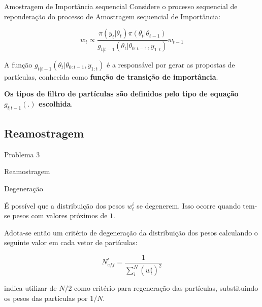 \documentclass{beamer}
\begin{document}
\begin{frame}{Amostragem de Importância sequencial}
Considere o processo sequencial de reponderação do processo de Amostragem sequencial de Importância:

$$
w_t \propto \frac{\pi(y_t|\theta_t)\pi(\theta_t|\theta_{t-1})}{g_{t|t-1}(\theta_t|\theta_{0:t-1},y_{1:t})} w_{t-1}
$$

\pause

A função $g_{t|t-1}(\theta_t|\theta_{0:t-1},y_{1:t})$ é a responsável por gerar as propostas de partículas, conhecida como \textbf{função de transição de importância}.

\vspace{0.5cm} 

\pause

\textbf{Os tipos de filtro de partículas são definidos pelo tipo de equação $g_{t|t-1}(.)$ escolhida}.

\end{frame}



\subsection{Reamostragem}

\begin{frame}{Problema 3}
    \begin{block}{}
      \Huge  Reamostragem
    \end{block}
\end{frame}


\begin{frame}{Degeneração}

É possível que a distribuição dos pesos $w^i_t$ se degenerem. Isso ocorre quando tem-se pesos com valores próximos de $1$.

\vspace{0.5cm} 
\pause

Adota-se então um critério de degeneração da distribuição dos pesos calculando o seguinte valor em cada vetor de partículas:

$$
N^t_{eff} = \frac{1}{\sum^N_ i{(w_t^{i})^2}}
$$


\pause

\cite{petris} indica utilizar de $N/2$ como critério para regeneração das partículas, substituindo os pesos das partículas por $1/N$.

\end{frame}
\end{document}
